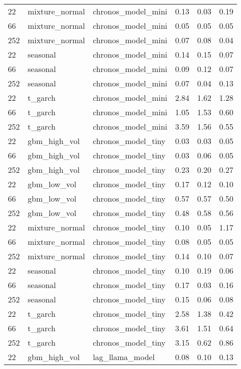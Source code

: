 {\begin{tabular}{lllrrr}
\midrule
22 & mixture\_normal & chronos\_model\_mini & 0.13 & 0.03 & 0.19 \\
66 & mixture\_normal & chronos\_model\_mini & 0.05 & 0.05 & 0.05 \\
252 & mixture\_normal & chronos\_model\_mini & 0.07 & 0.08 & 0.04 \\
\midrule
22 & seasonal & chronos\_model\_mini & 0.14 & 0.15 & 0.07 \\
66 & seasonal & chronos\_model\_mini & 0.09 & 0.12 & 0.07 \\
252 & seasonal & chronos\_model\_mini & 0.07 & 0.04 & 0.13 \\
\midrule
22 & t\_garch & chronos\_model\_mini & 2.84 & 1.62 & 1.28 \\
66 & t\_garch & chronos\_model\_mini & 1.05 & 1.53 & 0.60 \\
252 & t\_garch & chronos\_model\_mini & 3.59 & 1.56 & 0.55 \\
\midrule
22 & gbm\_high\_vol & chronos\_model\_tiny & 0.03 & 0.03 & 0.05 \\
66 & gbm\_high\_vol & chronos\_model\_tiny & 0.03 & 0.06 & 0.05 \\
252 & gbm\_high\_vol & chronos\_model\_tiny & 0.23 & 0.20 & 0.27 \\
\midrule
22 & gbm\_low\_vol & chronos\_model\_tiny & 0.17 & 0.12 & 0.10 \\
66 & gbm\_low\_vol & chronos\_model\_tiny & 0.57 & 0.57 & 0.50 \\
252 & gbm\_low\_vol & chronos\_model\_tiny & 0.48 & 0.58 & 0.56 \\
\midrule
22 & mixture\_normal & chronos\_model\_tiny & 0.10 & 0.05 & 1.17 \\
66 & mixture\_normal & chronos\_model\_tiny & 0.08 & 0.05 & 0.05 \\
252 & mixture\_normal & chronos\_model\_tiny & 0.14 & 0.10 & 0.07 \\
\midrule
22 & seasonal & chronos\_model\_tiny & 0.10 & 0.19 & 0.06 \\
66 & seasonal & chronos\_model\_tiny & 0.17 & 0.03 & 0.16 \\
252 & seasonal & chronos\_model\_tiny & 0.15 & 0.06 & 0.08 \\
\midrule
22 & t\_garch & chronos\_model\_tiny & 2.58 & 1.38 & 0.42 \\
66 & t\_garch & chronos\_model\_tiny & 3.61 & 1.51 & 0.64 \\
252 & t\_garch & chronos\_model\_tiny & 3.15 & 0.62 & 0.86 \\
\midrule
22 & gbm\_high\_vol & lag\_llama\_model & 0.08 & 0.10 & 0.13 \\

\end{tabular}}
